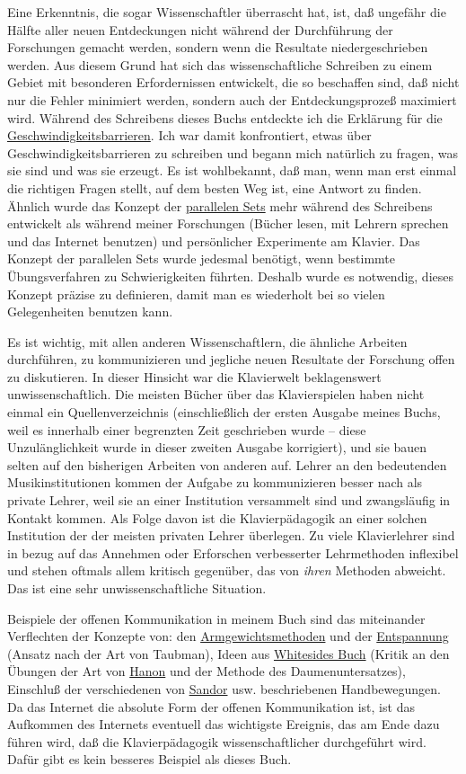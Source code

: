 Eine Erkenntnis, die sogar Wissenschaftler überrascht hat, ist, daß ungefähr die Hälfte aller neuen Entdeckungen nicht während der Durchführung der Forschungen gemacht werden, sondern wenn die Resultate niedergeschrieben werden.
Aus diesem Grund hat sich das wissenschaftliche Schreiben zu einem Gebiet mit besonderen Erfordernissen entwickelt, die so beschaffen sind, daß nicht nur die Fehler minimiert werden, sondern auch der Entdeckungsprozeß maximiert wird.
Während des Schreibens dieses Buchs entdeckte ich die Erklärung für die \hyperref[c1iv2b]{Geschwindigkeitsbarrieren}.
Ich war damit konfrontiert, etwas über Geschwindigkeitsbarrieren zu schreiben und begann mich natürlich zu fragen, was sie sind und was sie erzeugt.
Es ist wohlbekannt, daß man, wenn man erst einmal die richtigen Fragen stellt, auf dem besten Weg ist, eine Antwort zu finden.
Ähnlich wurde das Konzept der \hyperref[c1iii7b]{parallelen Sets} mehr während des Schreibens entwickelt als während meiner Forschungen (Bücher lesen, mit Lehrern sprechen und das Internet benutzen) und persönlicher Experimente am Klavier.
Das Konzept der parallelen Sets wurde jedesmal benötigt, wenn bestimmte Übungsverfahren zu Schwierigkeiten führten.
Deshalb wurde es notwendig, dieses Konzept präzise zu definieren, damit man es wiederholt bei so vielen Gelegenheiten benutzen kann.

Es ist wichtig, mit allen anderen Wissenschaftlern, die ähnliche Arbeiten durchführen, zu kommunizieren und jegliche neuen Resultate der Forschung offen zu diskutieren.
In dieser Hinsicht war die Klavierwelt beklagenswert unwissenschaftlich.
Die meisten Bücher über das Klavierspielen haben nicht einmal ein Quellenverzeichnis (einschließlich der ersten Ausgabe meines Buchs, weil es innerhalb einer begrenzten Zeit geschrieben wurde -- diese Unzulänglichkeit wurde in dieser zweiten Ausgabe korrigiert), und sie bauen selten auf den bisherigen Arbeiten von anderen auf.
Lehrer an den bedeutenden Musikinstitutionen kommen der Aufgabe zu kommunizieren besser nach als private Lehrer, weil sie an einer Institution versammelt sind und zwangsläufig in Kontakt kommen.
Als Folge davon ist die Klavierpädagogik an einer solchen Institution der der meisten privaten Lehrer überlegen.
Zu viele Klavierlehrer sind in bezug auf das Annehmen oder Erforschen verbesserter Lehrmethoden inflexibel und stehen oftmals allem kritisch gegenüber, das von \textit{ihren} Methoden abweicht.
Das ist eine sehr unwissenschaftliche Situation.

Beispiele der offenen Kommunikation in meinem Buch sind das miteinander Verflechten der Konzepte von: den \hyperref[c1ii10]{Armgewichtsmethoden} und der \hyperref[c1ii14]{Entspannung} (Ansatz nach der Art von Taubman), Ideen aus \hyperref[Whiteside]{Whitesides Buch} (Kritik an den Übungen der Art von \hyperref[c1iii7h]{Hanon} und der Methode des Daumenuntersatzes), Einschluß der verschiedenen von \hyperref[Sandor]{Sandor} usw. beschriebenen Handbewegungen.
Da das Internet die absolute Form der offenen Kommunikation ist, ist das Aufkommen des Internets eventuell das wichtigste Ereignis, das am Ende dazu führen wird, daß die Klavierpädagogik wissenschaftlicher durchgeführt wird.
Dafür gibt es kein besseres Beispiel als dieses Buch.

